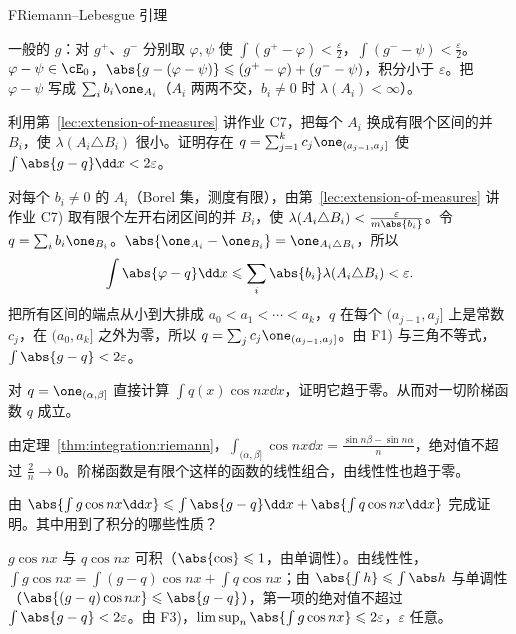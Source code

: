 \begin{probleme}{F}{Riemann--Lebesgue 引理}
\begin{questions}
\begin{solution}
一般的 $g$：对 $g^+$、$g^-$ 分别取 $\varphi,\psi$ 使 $\int(g^+-\varphi)<\frac\varepsilon2$，$\int(g^--\psi)<\frac\varepsilon2$。$\varphi-\psi\in\cE_0$，$\abs{g-(\varphi-\psi)}\leqslant(g^+-\varphi)+(g^--\psi)$，积分小于 $\varepsilon$。把 $\varphi-\psi$ 写成 $\sum_ib_i\one_{A_i}$（$A_i$ 两两不交，$b_i\neq0$ 时 $\lambda(A_i)<\infty$）。
\end{solution}
\item 利用第~\ref{lec:extension-of-measures} 讲作业 C7，把每个 $A_i$ 换成有限个区间的并 $B_i$，使 $\lambda(A_i\triangle B_i)$ 很小。证明存在 $q=\sum_{j=1}^kc_j\one_{(a_{j-1},a_j]}$ 使 $\int\abs{g-q}\dd x<2\varepsilon$。
\begin{solution}
对每个 $b_i\neq0$ 的 $A_i$（Borel 集，测度有限），由第~\ref{lec:extension-of-measures} 讲作业 C7) 取有限个左开右闭区间的并 $B_i$，使 $\lambda(A_i\triangle B_i)<\frac\varepsilon{m\abs{b_i}}$。令 $q=\sum_ib_i\one_{B_i}$。$\abs{\one_{A_i}-\one_{B_i}}=\one_{A_i\triangle B_i}$，所以
\[
\int\abs{\varphi-q}\dd x\leqslant\sum_i\abs{b_i}\lambda(A_i\triangle B_i)<\varepsilon .
\]
把所有区间的端点从小到大排成 $a_0<a_1<\cdots<a_k$，$q$ 在每个 $(a_{j-1},a_j]$ 上是常数 $c_j$，在 $(a_0,a_k]$ 之外为零，所以 $q=\sum_jc_j\one_{(a_{j-1},a_j]}$。由 F1) 与三角不等式，$\int\abs{g-q}<2\varepsilon$。
\end{solution}
\item 对 $q=\one_{(\alpha,\beta]}$ 直接计算 $\int q(x)\cos nx\dd x$，证明它趋于零。从而对一切阶梯函数 $q$ 成立。
\begin{solution}
由定理~\ref{thm:integration:riemann}，$\int_{(\alpha,\beta]}\cos nx\dd x=\frac{\sin n\beta-\sin n\alpha}n$，绝对值不超过 $\frac2n\to0$。阶梯函数是有限个这样的函数的线性组合，由线性性也趋于零。
\end{solution}
\item 由 $\abs{\int g\cos nx\dd x}\leqslant\int\abs{g-q}\dd x+\abs{\int q\cos nx\dd x}$ 完成证明。其中用到了积分的哪些性质？
\begin{solution}
$g\cos nx$ 与 $q\cos nx$ 可积（$\abs{\cos}\leqslant1$，由单调性）。由线性性，$\int g\cos nx=\int(g-q)\cos nx+\int q\cos nx$；由 $\abs{\int h}\leqslant\int\abs h$ 与单调性（$\abs{(g-q)\cos nx}\leqslant\abs{g-q}$），第一项的绝对值不超过 $\int\abs{g-q}<2\varepsilon$。由 F3)，$\limsup_n\abs{\int g\cos nx}\leqslant2\varepsilon$，$\varepsilon$ 任意。


\end{solution}
\end{questions}
\end{probleme}

